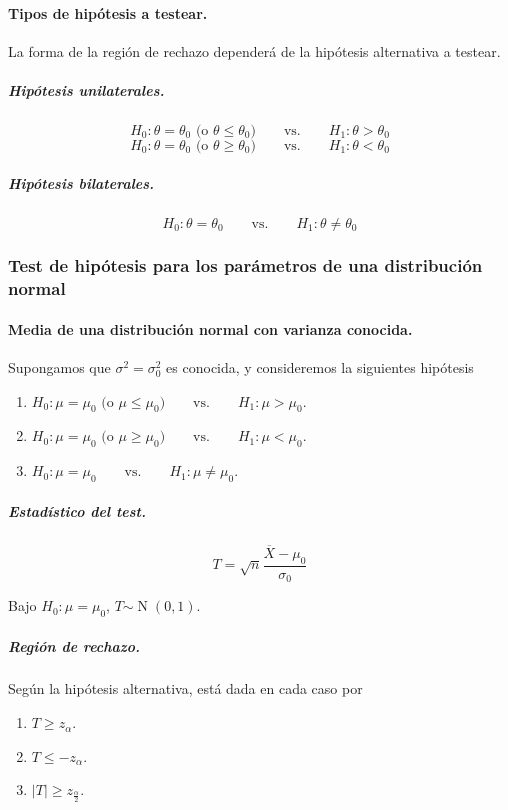 \documentclass[11pt]{article}
\theoremstyle{plain}
\theoremstyle{definition}
\theoremstyle{remark}
\newcommand{\dist}[1]{\ensuremath{\sim \operatorname{#1}}}  %
\begin{document}
    \paragraph{Tipos de hipótesis a testear.} La forma de la región de rechazo dependerá de la hipótesis alternativa a testear.
    \subparagraph{Hipótesis unilaterales.}
    \[ H_0 : \theta = \theta_0 \text{ (o $\theta \leq \theta_0$)} \qquad \text{vs.} \qquad H_1 : \theta > \theta_0 \]
    \[ H_0 : \theta = \theta_0 \text{ (o $\theta \geq \theta_0$)} \qquad \text{vs.} \qquad H_1 : \theta < \theta_0 \]
    \subparagraph{Hipótesis bilaterales.}
    \[ H_0 : \theta = \theta_0 \qquad \text{vs.} \qquad H_1 : \theta \neq \theta_0 \]

      \subsubsection{Test de hipótesis para los parámetros de una distribución normal}

        \paragraph{Media de una distribución normal con varianza conocida.}
          Supongamos que $\sigma^2 = \sigma^2_0$ es conocida, y consideremos la siguientes hipótesis
          \begin{enumerate}
            \item $ H_0 : \mu = \mu_0 \text{ (o $\mu \leq \mu_0$)} \qquad \text{vs.} \qquad H_1 : \mu > \mu_0 $.
            \item $ H_0 : \mu = \mu_0 \text{ (o $\mu \geq \mu_0$)} \qquad \text{vs.} \qquad H_1 : \mu < \mu_0 $.
            \item $ H_0 : \mu = \mu_0 \qquad \text{vs.} \qquad H_1 : \mu \neq \mu_0 $.
          \end{enumerate}

          \subparagraph{Estadístico del test.}
          \[ T = \sqrt{n} \frac{\overline{X} - \mu_0}{\sigma_0} \]

          Bajo $H_0 : \mu = \mu_0$, $T \dist{N}(0,1)$.

          \subparagraph{Región de rechazo.} Según la hipótesis alternativa, está dada en cada caso por
          \begin{enumerate}
            \item $T \geq z_\alpha$.
            \item $T \leq - z_\alpha$.
            \item $\vert T \vert \geq z_\frac{\alpha}{2}$.
          \end{enumerate}
\end{document}
